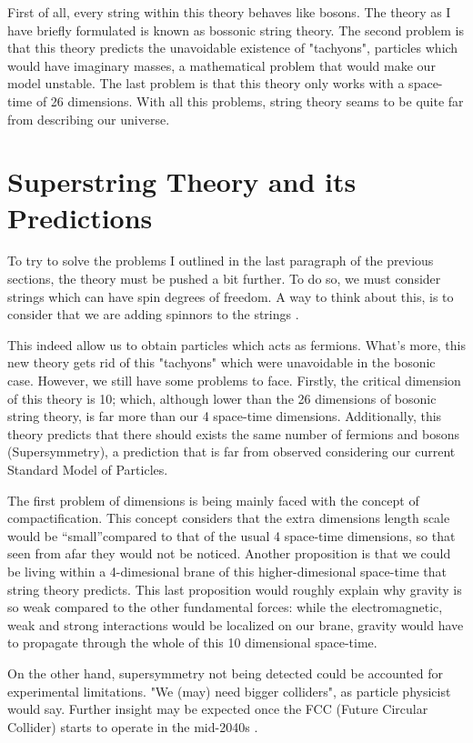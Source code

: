 \documentclass[12pt]{article}
\begin{document}
First of all, every string within this theory behaves like bosons. The theory as I have briefly formulated is known as bossonic string theory. The second problem is that this theory predicts the unavoidable existence of "tachyons", particles which would have imaginary masses, a mathematical problem that would make our model unstable. The last problem is that this theory only works with a space-time of 26 dimensions. With all this problems, string theory seams to be quite far from describing our universe.

\section{Superstring Theory and its Predictions}

To try to solve the problems I outlined in the last paragraph of the previous sections, the theory must be pushed a bit further. To do so, we must consider strings which can have spin degrees of freedom. A way to think about this, is to consider that we are adding spinnors to the strings \cite{Ortin:2015hya}.

This indeed allow us to obtain particles which acts as fermions. What's more, this new theory gets rid of this "tachyons" which were unavoidable in the bosonic case. However, we still have some problems to face. Firstly, the critical dimension of this theory is 10; which, although lower than the 26 dimensions of bosonic string theory, is far more than our 4 space-time dimensions. Additionally, this theory predicts that there should exists the same number of fermions and bosons (Supersymmetry), a prediction that is far from observed considering our current Standard Model of Particles.

The first problem of dimensions is being mainly faced with the concept of compactification. This concept considers that the extra dimensions length scale would be \textquotedblleft small\textquotedblright compared to that of the usual 4 space-time dimensions, so that seen from afar they would not be noticed. Another proposition is that we could be living within a 4-dimesional brane of this higher-dimesional space-time that string theory predicts. This last proposition would roughly explain why gravity is so weak compared to the other fundamental forces: while the electromagnetic, weak and strong interactions would be localized on our brane, gravity would have to propagate through the whole of this 10 dimensional space-time.

On the other hand, supersymmetry not being detected could be accounted for experimental limitations. "We (may) need bigger colliders", as particle physicist would say. Further insight may be expected once the FCC (Future Circular Collider) starts to operate in the mid-2040s \cite{Suarez:2022pcn}. 
\end{document}

